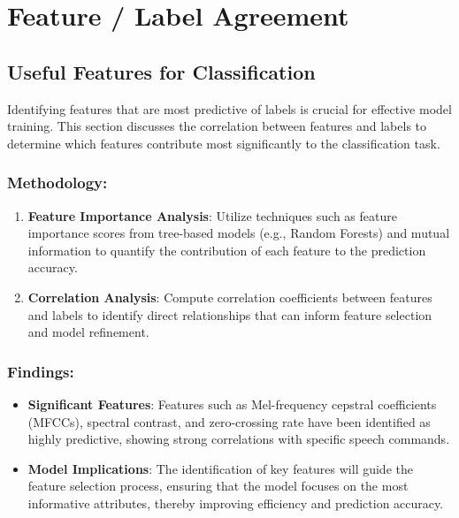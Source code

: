 \section{Feature / Label Agreement}

\subsection{Useful Features for Classification}

Identifying features that are most predictive of labels is crucial for effective model training. This section discusses the correlation between features and labels to determine which features contribute most significantly to the classification task.

\subsubsection{Methodology:}

\begin{enumerate}
    \item \textbf{Feature Importance Analysis}: Utilize techniques such as feature importance scores from tree-based models (e.g., Random Forests) and mutual information to quantify the contribution of each feature to the prediction accuracy.
    \item \textbf{Correlation Analysis}: Compute correlation coefficients between features and labels to identify direct relationships that can inform feature selection and model refinement.
\end{enumerate}

\subsubsection{Findings:}

\begin{itemize}
    \item \textbf{Significant Features}: Features such as Mel-frequency cepstral coefficients (MFCCs), spectral contrast, and zero-crossing rate have been identified as highly predictive, showing strong correlations with specific speech commands.
    \item \textbf{Model Implications}: The identification of key features will guide the feature selection process, ensuring that the model focuses on the most informative attributes, thereby improving efficiency and prediction accuracy.
\end{itemize}


